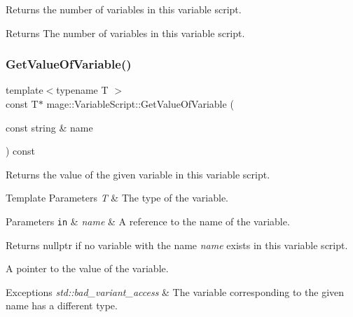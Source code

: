 Returns the number of variables in this variable script.

\begin{DoxyReturn}{Returns}
The number of variables in this variable script. 
\end{DoxyReturn}
\hypertarget{classmage_1_1_variable_script_a231b83e1e32b882489ed90faa69f7137}{}\label{classmage_1_1_variable_script_a231b83e1e32b882489ed90faa69f7137} 
\subsubsection{\texorpdfstring{Get\+Value\+Of\+Variable()}{GetValueOfVariable()}}
{\footnotesize\ttfamily template$<$typename T $>$ \\
const T$\ast$ mage\+::\+Variable\+Script\+::\+Get\+Value\+Of\+Variable (\begin{DoxyParamCaption}\item[{const string \&}]{name }\end{DoxyParamCaption}) const}

Returns the value of the given variable in this variable script.


\begin{DoxyTemplParams}{Template Parameters}
{\em T} & The type of the variable. \\
\hline
\end{DoxyTemplParams}

\begin{DoxyParams}[1]{Parameters}
\mbox{\tt in}  & {\em name} & A reference to the name of the variable. \\
\hline
\end{DoxyParams}
\begin{DoxyReturn}{Returns}
{\ttfamily nullptr} if no variable with the name {\itshape name} exists in this variable script. 

A pointer to the value of the variable. 
\end{DoxyReturn}

\begin{DoxyExceptions}{Exceptions}
{\em std\+::bad\+\_\+variant\+\_\+access} & The variable corresponding to the given name has a different type. \\
\hline
\end{DoxyExceptions}
\hypertarget{classmage_1_1_variable_script_a777430f641224bf217c958ef4ecde129}{}\label{classmage_1_1_variable_script_a777430f641224bf217c958ef4ecde129} 
